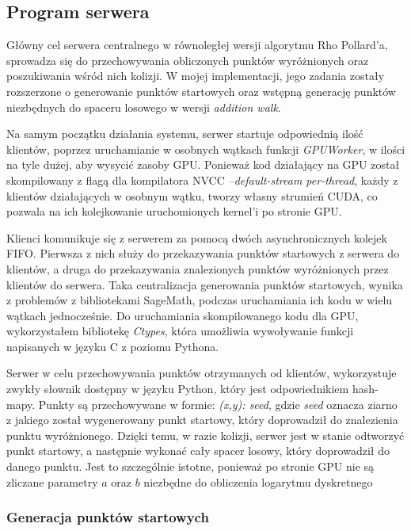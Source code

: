 \subsection{Program serwera}
Główny cel serwera centralnego w równoległej wersji algorytmu Rho Pollard'a, sprowadza się do
przechowywania obliczonych punktów wyróżnionych oraz poszukiwania wśród nich kolizji.
W mojej implementacji, jego zadania zostały rozszerzone o generowanie punktów startowych
oraz wstępną generację punktów niezbędnych do spaceru losowego w wersji \textit{addition walk}.
\par
Na samym początku działania systemu, serwer startuje odpowiednią ilość
klientów, poprzez uruchamianie w osobnych wątkach funkcji \textit{GPUWorker},
w ilości na tyle dużej, aby wysycić zasoby GPU.
Ponieważ kod działający na GPU został skompilowany z flagą dla kompilatora NVCC \textit{--default-stream per-thread},
każdy z klientów działających w osobnym wątku, tworzy własny strumień CUDA, co pozwala na ich kolejkowanie uruchomionych kernel'i po stronie GPU.
\par
Klienci komunikuje się z serwerem za pomocą dwóch asynchronicznych kolejek FIFO.
Pierwsza z nich służy do przekazywania punktów startowych z serwera do klientów, a druga do przekazywania
znalezionych punktów wyróżnionych przez klientów do serwera. Taka centralizacja
generowania punktów startowych, wynika z problemów z bibliotekami SageMath,
podczas uruchamiania ich kodu w wielu wątkach jednocześnie.
Do uruchamiania skompilowanego kodu dla GPU, wykorzystałem
bibliotekę \textit{Ctypes}, która umożliwia wywoływanie funkcji napisanych w języku C z poziomu Pythona.
\par
Serwer w celu przechowywania punktów otrzymanych od klientów, wykorzystuje
zwykły słownik dostępny w języku Python, który jest odpowiednikiem hash-mapy.
Punkty są przechowywane w formie: \textit{(x,y): seed}, gdzie \textit{seed} oznacza
ziarno z jakiego został wygenerowany punkt startowy, który doprowadził do znalezienia punktu wyróżnionego.
Dzięki temu, w razie kolizji, serwer jest w stanie odtworzyć punkt startowy, a następnie wykonać cały spacer losowy, który doprowadził do danego punktu.
Jest to szczególnie istotne, ponieważ po stronie GPU nie są zliczane parametry $a$ oraz $b$ niezbędne do obliczenia
logarytmu dyskretnego

\subsubsection*{Generacja punktów startowych}

